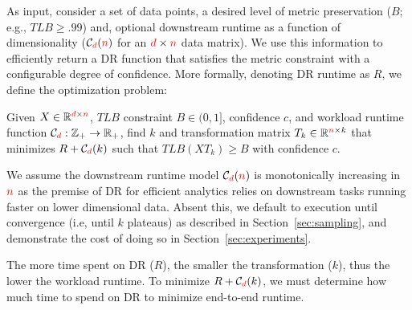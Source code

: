 As input, consider a set of data points, a desired level of metric preservation ($B$; e.g., $TLB \geq .99$) and, optional downstream runtime as a function of dimensionality ($\mathcal{C}_{\color{red}d}({\color{red}n})$ for an ${\color{red}d}\times {\color{red}n}$ data matrix).  
We use this information to efficiently return a DR function that satisfies the metric constraint with a configurable degree of confidence.
More formally, denoting DR runtime as $R$, we define the optimization problem:
\begin{problem}
\label{def:opt}
  Given $X \in \mathbb{R}^{{\color{red}d} \times {\color{red}n}}$, $TLB$ constraint $B \in 
  (0, 1]$, confidence $c$, and workload runtime function $\mathcal{C}_{\color{red}d}:\mathbb{Z}_{+} \rightarrow \mathbb{R}_{+}$, find $k$ and transformation
  matrix $T_k \in \mathbb{R}^{{\color{red}n} \times k}$ that minimizes $R + \mathcal{C}_{\color{red}d}(k)$
  such that $TLB(XT_k) \geq B$ with confidence $c$.
\end{problem}

We assume the downstream runtime model $\mathcal{C}_{\color{red}d}({\color{red}n})$ is monotonically increasing in ${\color{red}n}$ as the premise of DR for efficient analytics relies on downstream tasks running faster on lower dimensional data.
Absent this, we default to execution until convergence (i.e, until $k$ plateaus) as described in Section~\ref{sec:sampling}, and demonstrate the cost of doing so in Section~\ref{sec:experiments}.

The more time spent on DR ($R$), the smaller the transformation ($k$), thus the lower the workload runtime.
To minimize $R + \mathcal{C}_{\color{red}d}(k)$, we must determine how much time to spend on DR to minimize end-to-end runtime.

